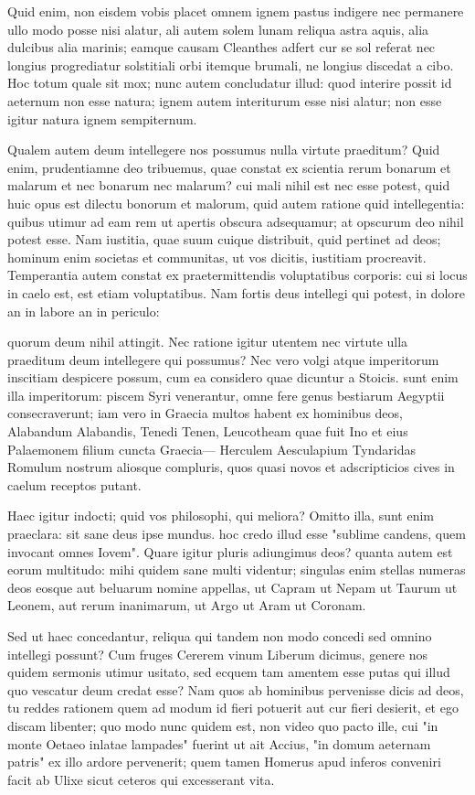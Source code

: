  Quid enim, non eisdem vobis placet omnem ignem pastus indigere nec permanere ullo modo posse nisi alatur, ali autem solem lunam reliqua astra aquis, alia dulcibus alia marinis; eamque causam Cleanthes adfert cur se sol referat nec longius progrediatur solstitiali orbi itemque brumali, ne longius discedat a cibo. Hoc totum quale sit mox; nunc autem concludatur illud: quod interire possit id aeternum non esse natura; ignem autem interiturum esse nisi alatur; non esse igitur natura ignem sempiternum.

 Qualem autem deum intellegere nos possumus nulla virtute praeditum? Quid enim, prudentiamne deo tribuemus, quae constat ex scientia rerum bonarum et malarum et nec bonarum nec malarum? cui mali nihil est nec esse potest, quid huic opus est dilectu bonorum et malorum, quid autem ratione quid intellegentia: quibus utimur ad eam rem ut apertis obscura adsequamur; at opscurum deo nihil potest esse. Nam iustitia, quae suum cuique distribuit, quid pertinet ad deos; hominum enim societas et communitas, ut vos dicitis, iustitiam procreavit. Temperantia autem constat ex praetermittendis voluptatibus corporis: cui si locus in caelo est, est etiam voluptatibus. Nam fortis deus intellegi qui potest, in dolore an in labore an in periculo:

 quorum deum nihil attingit. Nec ratione igitur utentem nec virtute ulla praeditum deum intellegere qui possumus? Nec vero volgi atque imperitorum inscitiam despicere possum, cum ea considero quae dicuntur a Stoicis. sunt enim illa imperitorum: piscem Syri venerantur, omne fere genus bestiarum Aegyptii consecraverunt; iam vero in Graecia multos habent ex hominibus deos, Alabandum Alabandis, Tenedi Tenen, Leucotheam quae fuit Ino et eius Palaemonem filium cuncta Graecia— Herculem Aesculapium Tyndaridas Romulum nostrum aliosque compluris, quos quasi novos et adscripticios cives in caelum receptos putant.

 Haec igitur indocti; quid vos philosophi, qui meliora? Omitto illa, sunt enim praeclara: sit sane deus ipse mundus. hoc credo illud esse "sublime candens, quem invocant omnes Iovem". Quare igitur pluris adiungimus deos? quanta autem est eorum multitudo: mihi quidem sane multi videntur; singulas enim stellas numeras deos eosque aut beluarum nomine appellas, ut Capram ut Nepam ut Taurum ut Leonem, aut rerum inanimarum, ut Argo ut Aram ut Coronam.

 Sed ut haec concedantur, reliqua qui tandem non modo concedi sed omnino intellegi possunt? Cum fruges Cererem vinum Liberum dicimus, genere nos quidem sermonis utimur usitato, sed ecquem tam amentem esse putas qui illud quo vescatur deum credat esse? Nam quos ab hominibus pervenisse dicis ad deos, tu reddes rationem quem ad modum id fieri potuerit aut cur fieri desierit, et ego discam libenter; quo modo nunc quidem est, non video quo pacto ille, cui "in monte Oetaeo inlatae lampades" fuerint ut ait Accius, "in domum aeternam patris" ex illo ardore pervenerit; quem tamen Homerus apud inferos conveniri facit ab Ulixe sicut ceteros qui excesserant vita.

